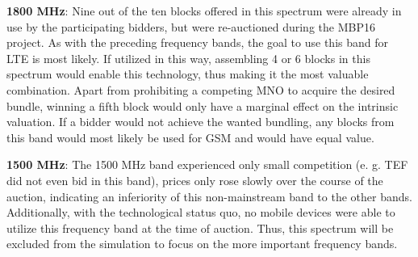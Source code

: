 \textbf{1800 MHz}: Nine out of the ten blocks offered in this spectrum were already in use by the participating bidders, but were re-auctioned during the MBP16 project. As with the preceding frequency bands, the goal to use this band for LTE is most likely. If utilized in this way, assembling 4 or 6 blocks in this spectrum would enable this technology, thus making it the most valuable combination. Apart from prohibiting a competing MNO to acquire the desired bundle, winning a fifth block would only have a marginal effect on the intrinsic valuation. If a bidder would not achieve the wanted bundling, any blocks from this band would most likely be used for GSM and would have equal value. %

\textbf{1500 MHz}: The 1500 MHz band experienced only small competition (e. g. TEF did not even bid in this band), prices only rose slowly over the course of the auction, indicating an inferiority of this non-mainstream band to the other bands. Additionally, with the technological status quo, no mobile devices were able to utilize this frequency band at the time of auction. Thus, this spectrum will be excluded from the simulation to focus on the more important frequency bands.


